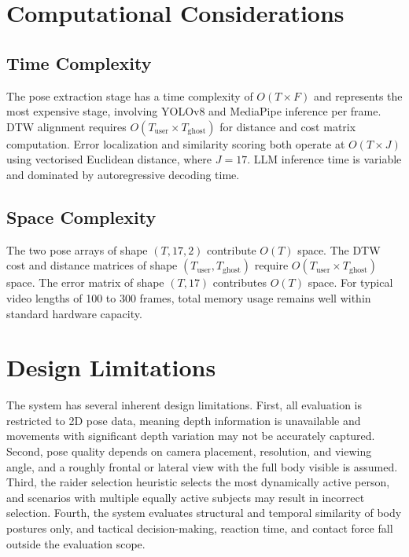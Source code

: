 \section{Computational Considerations}

\subsection{Time Complexity}

The pose extraction stage has a time complexity of $O(T \times F)$ and represents the most expensive stage, involving YOLOv8 and MediaPipe inference per frame. DTW alignment requires $O(T_{\text{user}} \times T_{\text{ghost}})$ for distance and cost matrix computation. Error localization and similarity scoring both operate at $O(T \times J)$ using vectorised Euclidean distance, where $J = 17$. LLM inference time is variable and dominated by autoregressive decoding time.

\subsection{Space Complexity}

The two pose arrays of shape $(T, 17, 2)$ contribute $O(T)$ space. The DTW cost and distance matrices of shape $(T_{\text{user}}, T_{\text{ghost}})$ require $O(T_{\text{user}} \times T_{\text{ghost}})$ space. The error matrix of shape $(T, 17)$ contributes $O(T)$ space. For typical video lengths of 100 to 300 frames, total memory usage remains well within standard hardware capacity.


\section{Design Limitations}

The system has several inherent design limitations. First, all evaluation is restricted to 2D pose data, meaning depth information is unavailable and movements with significant depth variation may not be accurately captured. Second, pose quality depends on camera placement, resolution, and viewing angle, and a roughly frontal or lateral view with the full body visible is assumed. Third, the raider selection heuristic selects the most dynamically active person, and scenarios with multiple equally active subjects may result in incorrect selection. Fourth, the system evaluates structural and temporal similarity of body postures only, and tactical decision-making, reaction time, and contact force fall outside the evaluation scope.
